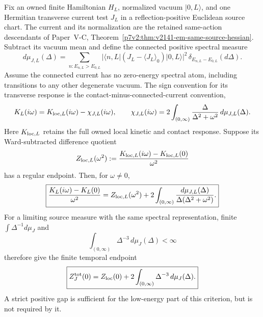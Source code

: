 \documentclass[12pt,a4paper]{article}
\begin{document}
\begin{theorem}
\label{p12:thm:v299-current-weighted-ir}
Fix an owned finite Hamiltonian $H_L$, normalized vacuum $|0,L\rangle$,
and one Hermitian transverse current test $J_L$ in a reflection-positive
Euclidean source chart.  The current and its normalization are the retained
same-action descendants of Paper~V-C,
Theorem~\ref{p7v2:thm:v2141-em-same-source-hessian}.  Subtract its vacuum mean
and define the connected positive spectral measure
\begin{equation}
\label{p12:eq:v299-current-spectral-measure}
 d\mu_{J,L}(\Delta)
 =\sum_{n:E_{n,L}>E_{0,L}}
 |\langle n,L|(J_L-\langle J_L\rangle_0)|0,L\rangle|^2
 \,\delta_{E_{n,L}-E_{0,L}}(d\Delta).
\end{equation}
Assume the connected current has no zero-energy spectral atom, including
transitions to any other degenerate vacuum.  The sign convention for its
transverse response is the contact-minus-connected-current convention,
\[
 K_L(i\omega)=K_{{\rm loc},L}(i\omega)-\chi_{J,L}(i\omega),
 \qquad
 \chi_{J,L}(i\omega)
 =2\int_{(0,\infty)}\frac{\Delta}{\Delta^2+\omega^2}
                 \,d\mu_{J,L}(\Delta).
\]
Here $K_{{\rm loc},L}$ retains the full owned local kinetic and contact
response.  Suppose its Ward-subtracted difference quotient
\[
 Z_{{\rm loc},L}(\omega^2)
 :=\frac{K_{{\rm loc},L}(i\omega)-K_{{\rm loc},L}(0)}{\omega^2}
\]
has a regular endpoint.  Then, for $\omega\ne0$,
\begin{equation}
\label{p12:eq:v299-current-ir-difference-quotient}
 \boxed{\frac{K_L(i\omega)-K_L(0)}{\omega^2}
 =Z_{{\rm loc},L}(\omega^2)
 +2\int_{(0,\infty)}
       \frac{d\mu_{J,L}(\Delta)}{\Delta(\Delta^2+\omega^2)}.}
\end{equation}
For a limiting source measure with the same spectral representation, finite
$\int\Delta^{-1}d\mu_J$ and
\begin{equation}
\label{p12:eq:v299-current-inverse-cubic-moment}
 \int_{(0,\infty)}\Delta^{-3}\,d\mu_J(\Delta)<\infty
\end{equation}
therefore give the finite temporal endpoint
\begin{equation}
\label{p12:eq:v299-current-ir-endpoint}
 \boxed{Z_J^{\rm tot}(0)=Z_{\rm loc}(0)
                   +2\int_{(0,\infty)}\Delta^{-3}\,d\mu_J(\Delta).}
\end{equation}
A strict positive gap is sufficient for the low-energy part of this
criterion, but is not required by it.
\end{theorem}
\end{document}
